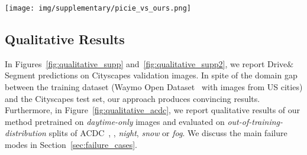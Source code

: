 \documentclass[runningheads]{llncs}
\newcommand{\ours}{Drive$\&$Segment\xspace}
\begin{document}
\begin{figure*}[t]
    \centering
    \texttt{[image: img/supplementary/picie\_vs\_ours.png]}
    \vspace{-4ex}
    \caption{\textbf{Qualitative comparison of PiCIE~\cite{cho2021picie}, IIC~\cite{ji2019invariant} and our \ours approach on PiCIE \emph{training} samples.} For a fair comparison, we use the same visualization procedure as in~\cite{cho2021picie}. 
    Results are shown on center-cropped Cityscapes training images. Note that our method is able to capture objects' contours much better and to segment categories such as \emph{person} that are not visible in IIC or PiCIE results.}
    \label{fig:ours_vs_picie_crops}
\end{figure*}


\subsection{Qualitative Results}
\label{sec:qual_ours}
In Figures~\ref{fig:qualitative_supp} and~\ref{fig:qualitative_supp2},
we report \ours predictions on Cityscapes validation images. In spite of the domain gap between the training dataset (Waymo Open Dataset~\cite{sun2020scalability} with images from US cities) and the Cityscapes test set, our approach produces convincing results. 
Furthermore, in Figure~\ref{fig:qualitative_acdc}, we report qualitative results of our method pretrained on \emph{daytime-only} images and evaluated on \emph{out-of-training-distribution} splits of ACDC~\cite{SDV21}, \eg, \emph{night}, \emph{snow} or \emph{fog}.
We discuss the main failure modes in  Section~\ref{sec:failure_cases}.
\end{document}
